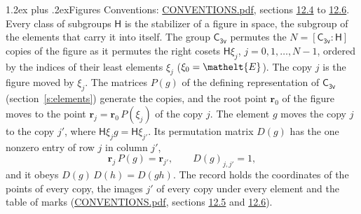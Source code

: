 \documentclass[10pt,a4paper]{article}
\makeatletter
\renewcommand\section{\@startsection{section}{1}{\z@}{-3ex plus -1ex minus -.2ex}%
  {1.2ex plus .2ex}{\normalfont\large\sffamily\bfseries\color{parttitle}}}
\numberwithin{equation}{section}
\newcommand{\eltfont}[1]{{\let\sigma\eltsigma\mathelt{#1}}}
\newcommand{\grp}[1]{\mathsf{#1}}
\newcommand{\cls}[1]{\eltfont{#1}}
\newcommand{\pointr}{\mathbf{r}}
\makeatother
\begin{document}
\section{Figures}\label{s:permutation}
Conventions: \href{../../CONVENTIONS.pdf}{CONVENTIONS.pdf}, sections \href{../../CONVENTIONS.pdf\#conv.12.4}{12.4} to \href{../../CONVENTIONS.pdf\#conv.12.6}{12.6}.
Every class of subgroups $\grp{H}$ is the stabilizer of a figure in space, the subgroup of the elements that carry it into itself. \label{n:local.orbit.size}\label{n:element.coset.least}\label{n:index.coset}The group $\grp{C_{3v}}$ permutes the $N = [\grp{C_{3v}} : \grp{H}]$ copies of the figure as it permutes the right cosets $\grp{H}\xi_j$, $j = 0, 1, \dots, N - 1$, ordered by the indices of their least elements $\xi_j$ ($\xi_0 = \cls{E}$). The copy $j$ is the figure moved by $\xi_j$. The matrices $P(g)$ of the defining representation of $\grp{C_{3v}}$ (section~\ref{s:elements}) generate the copies, and the root point $\pointr_0$ of the figure moves to the point $\pointr_j = \pointr_0\, P(\xi_j)$ of the copy $j$. \label{n:local.coset.image}The element $g$ moves the copy $j$ to the copy $j'$, where $\grp{H}\xi_j g = \grp{H}\xi_{j'}$. \label{n:local.matrix.permutation}Its permutation matrix $D(g)$ has the one nonzero entry of row $j$ in column $j'$,
\begin{equation}\label{e:perm.matrix}\pointr_j\, P(g) = \pointr_{j'}, \qquad D(g)_{j,j'} = 1,\end{equation}
and it obeys $D(g)\, D(h) = D(gh)$. The record holds the coordinates of the points of every copy, the images $j'$ of every copy under every element and the table of marks (\href{../../CONVENTIONS.pdf}{CONVENTIONS.pdf}, sections \href{../../CONVENTIONS.pdf\#conv.12.5}{12.5} and \href{../../CONVENTIONS.pdf\#conv.12.6}{12.6}).
\end{document}
